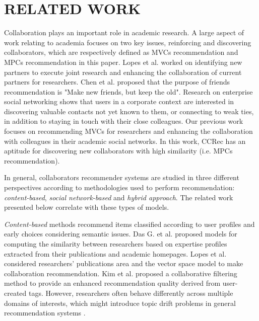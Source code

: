 \section*{RELATED WORK}
Collaboration plays an important role in academic research. A large aspect of work relating to academia focuses on two key issues, reinforcing and discovering collaborators, which are respectively defined as MVCs recommendation and MPCs recommendation in this paper. Lopes et al. \cite{lopes2010collaboration} worked on identifying new partners to execute joint research and enhancing the collaboration of current partners for researchers. Chen et al. \cite{chen2009make} proposed that the purpose of friends recommendation is "Make new friends, but keep the old". Research on enterprise social networking \cite{dimicco2008motivations} shows that users in a corporate context are interested in discovering valuable contacts not yet known to them, or connecting to weak ties, in addition to staying in touch with their close colleagues. Our previous work \cite{li2014acrec} focuses on recommending MVCs for researchers and enhancing the collaboration with colleagues in their academic social networks. In this work, CCRec has an aptitude for discovering new collaborators with high similarity (i.e. MPCs recommendation).

In general, collaborators recommender systems are studied in three different perspectives according to methodologies used to perform recommendation: \emph{content-based}, \emph{social network-based} and \emph{hybrid approach}. The related work presented below correlate with these types of models.

\emph{Content-based} methods recommend items classified according to user profiles and early choices considering semantic issues. Das G. et al. \cite{gollapalli2012similar} proposed models for computing the similarity between researchers based on expertise profiles extracted from their publications and academic homepages. Lopes et al. \cite{lopes2010collaboration} considered researchers' publications area and the vector space model to make collaboration recommendation. Kim et al. \cite{kim2010collaborative} proposed a collaborative filtering method to provide an enhanced recommendation quality derived from user-created tags. However, researchers often behave differently across multiple domains of interests, which might introduce topic drift problems in general recommendation systems \cite{tang2012cross}.

